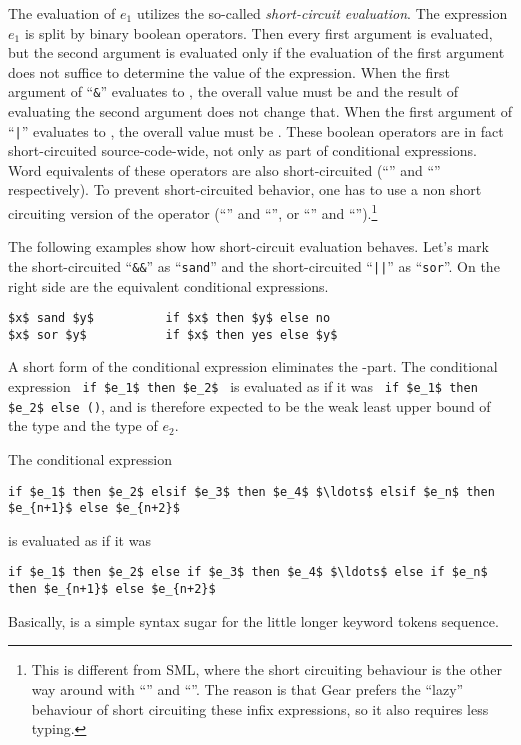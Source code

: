 The evaluation of $e_1$ utilizes the so-called {\em short-circuit evaluation}. The expression $e_1$ is split by binary boolean operators. Then every first argument is evaluated, but the second argument is evaluated only if the evaluation of the first argument does not suffice to determine the value of the expression. When the first argument of ``\lstinline!&!'' evaluates to , the overall value must be  and the result of evaluating the second argument does not change that. When the first argument of ``\lstinline!|!'' evaluates to , the overall value must be . These boolean operators are in fact short-circuited source-code-wide, not only as part of conditional expressions. Word equivalents of these operators are also short-circuited (``'' and ``'' respectively). To prevent short-circuited behavior, one has to use a non short circuiting version of the operator (``'' and ``'', or ``\code{&&}'' and ``\code{||}'').\footnote{This is different from SML, where the short circuiting behaviour is the other way around with ``'' and ``''. The reason is that Gear prefers the ``lazy'' behaviour of short circuiting these infix expressions, so it also requires less typing.}

\example The following examples show how short-circuit evaluation behaves. Let's mark the short-circuited ``\lstinline!&&!'' as ``\lstinline!sand!'' and the short-circuited ``\lstinline!||!'' as ``\lstinline!sor!''. On the right side are the equivalent conditional expressions. 
\begin{lstlisting}
$x$ sand $y$          if $x$ then $y$ else no
$x$ sor $y$           if $x$ then yes else $y$
\end{lstlisting}

A short form of the conditional expression eliminates the -part. The conditional expression ~\lstinline!if $e_1$ then $e_2$!~ is evaluated as if it was ~\lstinline!if $e_1$ then $e_2$ else ()!, and is therefore expected to be the weak least upper bound of the type  and the type of $e_2$. 

The conditional expression 
\begin{lstlisting}
if $e_1$ then $e_2$ elsif $e_3$ then $e_4$ $\ldots$ elsif $e_n$ then $e_{n+1}$ else $e_{n+2}$
\end{lstlisting} 
is evaluated as if it was 
\begin{lstlisting}
if $e_1$ then $e_2$ else if $e_3$ then $e_4$ $\ldots$ else if $e_n$ then $e_{n+1}$ else $e_{n+2}$
\end{lstlisting}
Basically,  is a simple syntax sugar for the little longer  keyword tokens sequence. 

